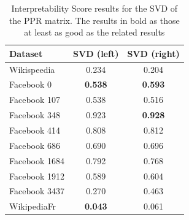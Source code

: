 \begin{table}[t]
    \caption[Interpretability Score results for the SVD of the PPR matrix]{Interpretability Score results for the SVD of the PPR matrix. The results in bold as those at least as good as the related \parfaite results}
    \begin{center}
        \begin{tabular}{l|c|c}
            \hline
            \textbf{Dataset} & \textbf{SVD (left)} & \textbf{SVD (right)}\\
            \hline
Wikispeedia  & 0.234 & 0.204\\
Facebook 0 & \textbf{0.538} & \textbf{0.593}\\
Facebook 107 & 0.538 & 0.516\\
Facebook 348 & 0.923 & \textbf{0.928}\\
Facebook 414 & 0.808 & 0.812\\
Facebook 686 & 0.690 & 0.696\\
Facebook 1684 & 0.792 & 0.768\\
Facebook 1912 & 0.589 & 0.604\\
Facebook 3437 & 0.270 & 0.463\\
WikipediaFr  & \textbf{0.043} & 0.061\\
\hline
        \end{tabular}
    \end{center}
    \label{tab:IS_SVD_scores}
\end{table}

